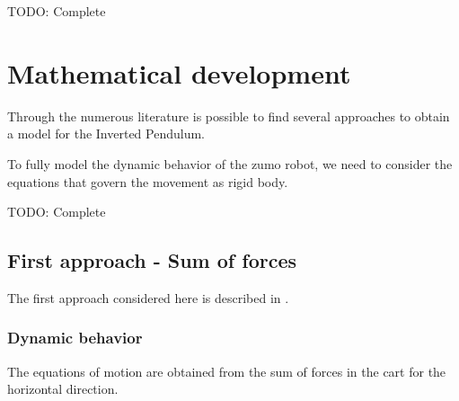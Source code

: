 \documentclass{article}
\begin{document}

TODO: Complete

\section{Mathematical development}

Through the numerous literature is possible to find several approaches to obtain a model for the Inverted Pendulum.

To fully model the dynamic behavior of the zumo robot, we need to consider the equations that govern the movement as rigid body.

TODO: Complete

\subsection{First approach - Sum of forces}

The first approach considered here is described in \cite{SUL03}.

\subsubsection{Dynamic behavior}

The equations of motion are obtained from the sum of forces in the cart for the horizontal direction.
\end{document}
